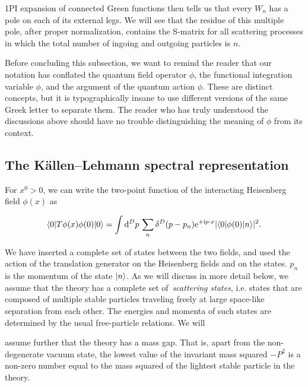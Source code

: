 1PI expansion of connected Green functions then tells us that every $W_n$ has a pole
on each of its external legs. We will see that the residue of this multiple pole, after
proper normalization, contains the S-matrix for all scattering processes in which the
total number of ingoing and outgoing particles is $n$.

Before concluding this subsection, we want to remind the reader that our notation has
conflated the quantum field operator $\phi$, the functional integration variable $\phi$, and the
argument of the quantum action $\phi$. These are distinct concepts, but it is typographically
insane to use different versions of the same Greek letter to separate them. The reader
who has truly understood the discussions above should have no trouble distinguishing
the meaning of $\phi$ from its context.

\subsection{The Källen--Lehmann spectral representation}

For $x^0>0$, we can write the two-point function of the interacting Heisenberg field
$\phi(x)$ as

\begin{equation}
\langle0|T\phi(x)\phi(0)|0\rangle
=\int\mathop{}\!\mathrm{d}^D p\,\sum_n\delta^D(p-p_n)\mathrm{e}^{+\mathrm{i} p\mathbin{\cdot}x}\lvert\langle0|\phi(0)|n\rangle\rvert^2.
\label{eq:3.39}
\end{equation}

We have inserted a complete set of states between the two fields, and used the action of
the translation generator on the Heisenberg fields and on the states. $p_n$ is the momentum
of the state $\lvert n\rangle$. As we will discuss in more detail below, we assume that the theory has
a complete set of \,\emph{scattering states}, i.e. states that are composed of multiple stable
particles traveling freely at large space-like separation from each other. The energies
and momenta of such states are determined by the usual free-particle relations. We will

assume further that the theory has a mass gap. That is, apart from the non-degenerate
vacuum state, the lowest value of the invariant mass squared $-P^2$ is a non-zero number
equal to the mass squared of the lightest stable particle in the theory.

